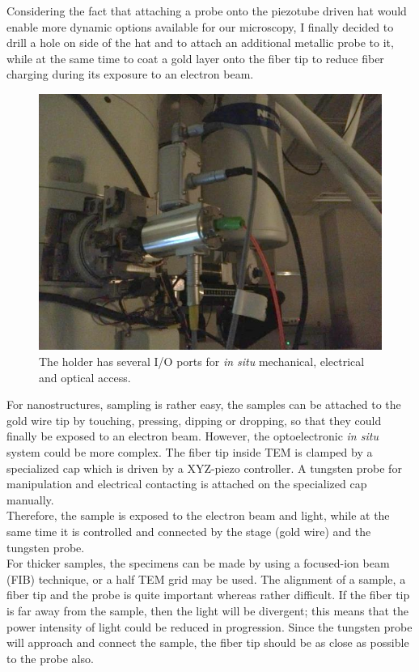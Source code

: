 
Considering the fact that attaching a probe onto the piezotube driven hat would enable more dynamic options available for our microscopy, I finally decided to drill a hole on side of the hat and to attach an additional metallic probe to it, while at the same time to coat a gold layer onto the fiber tip to reduce fiber charging during its exposure to an electron beam. 

\begin{figure}  
\centering
\includegraphics[width=\textwidth]{figures/figure2_holderbot}
\caption[Outside of holder]{The holder has several I/O ports for {\em in situ} mechanical, electrical and optical access.
\label{fig:2_bot}}
\end{figure}

For nanostructures, sampling is rather easy, the samples can be attached to the gold wire tip by touching, pressing, dipping or dropping, so that they could finally be exposed to an electron beam.
However, the optoelectronic {\em in situ} system could be more complex. The fiber tip inside TEM is clamped by a specialized cap which is driven by a XYZ-piezo controller. A tungsten probe for manipulation and electrical contacting is attached on the specialized cap manually. \\
Therefore, the sample is exposed to the electron beam and light, while at the same time it is controlled and connected by the stage (gold wire) and the tungsten probe. \\

For thicker samples, the specimens can be made by using a focused-ion beam (FIB) technique, or a half TEM grid may be used. 
The alignment of a sample, a fiber tip and the probe is quite important whereas rather difficult. If the fiber tip is far away from the sample, then the light will be divergent; this means that the power intensity of light could be reduced in progression. Since the tungsten probe will approach and connect the sample, the fiber tip should be as close as possible to the probe also. 

